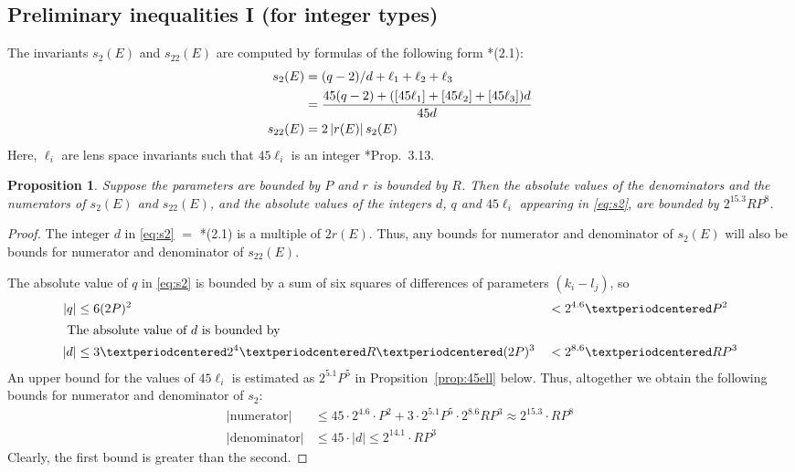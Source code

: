 \documentclass{article}
\newtheorem{prop}{Proposition}
\newcommand{\abs}[1]{\left|#1\right|}
\begin{document}
\subsection*{Preliminary inequalities I (for integer types)}
The invariants \(s_2(E)\) and \(s_{22}(E)\) are computed by formulas of the following form \cite{CEZ}*{(2.1)}:
\begin{align}\label{eq:s2}
  \notag  s_2(E)   &= (q-2)/d + \ell_1 + \ell_2 + \ell_3\\
                   &= \frac{45(q-2) + ([45\ell_1] + [45\ell_2] + [45\ell_3])d}{45d}\\
  s_{22}(E) &= 2 \abs{r(E)} s_2(E) 
\end{align}  
Here, \(\ell_i\) are lens space invariants such that \(45\ell_i\) is an integer \cite{CEZ}*{Prop.~3.13}.  

\begin{prop}\label{prop:s2-integers}
  Suppose the parameters are bounded by \(P\) and \(r\) is bounded by \(R\).  Then the absolute values of the denominators and the numerators of \(s_2(E)\) and \(s_{22}(E)\), and the absolute values of the integers \(d\), \(q\) and \(45\ell_i\) appearing in \eqref{eq:s2}, are bounded by \(2^{15.3}RP^8\).
\end{prop}
 
\begin{proof}
The integer \(d\) in \eqref{eq:s2} \(=\) \cite{CEZ}*{(2.1)} is a multiple of \(2r(E)\).  Thus, any bounds for numerator and denominator of \(s_2(E)\) will also be bounds for numerator and denominator of \(s_{22}(E)\).

The absolute value of \(q\) in \eqref{eq:s2} is bounded by a sum of six squares of differences of parameters \((k_i-l_j)\), so 
\begin{alignat}{7}
  \abs{q}&\leq 6(2P)^2 &&< 2^{4.6}·P^2\\
  \intertext{
  The absolute value of \(d\) is bounded by}
  \abs{d} &\leq 3 · 2^4 · R · (2P)^3 &&< 2^{8.6} · RP^3
\end{alignat}
An upper bound for the values of  \(45\ell_i\) is estimated as \(2^{5.1}P^5\) in  Propsition~\ref{prop:45ell} below. 
Thus, altogether we obtain the following bounds for numerator and denominator of \(s_2\):
\begin{align*}
  \abs{\text{numerator}} &\leq 45·2^{4.6}·P^2 + 3·2^{5.1}P^5·2^{8.6}RP^3 \approx 2^{15.3}·RP^8\\
  \abs{\text{denominator}} &\leq 45·\abs{d} \leq 2^{14.1}· R P^3
\end{align*}
Clearly, the first bound is greater than the second. 
\end{proof}
\end{document}
